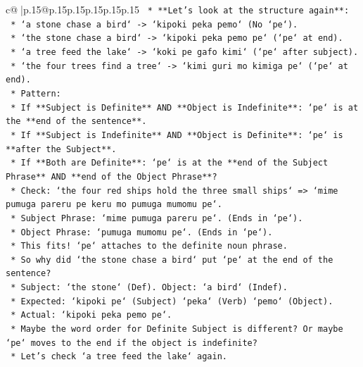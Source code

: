 \documentclass{article}
\begin{document}
{\begin{supertabular}{c@{$\;$}|p{.15\linewidth}@{}p{.15\linewidth}p{.15\linewidth}p{.15\linewidth}p{.15\linewidth}p{.15\linewidth}}
{{{\texttt{            *   **Let's look at the structure again**:} \\
\texttt{                *   `a stone chase a bird` {-}> `kipoki peka pemo` (No `pe`).} \\
\texttt{                *   `the stone chase a bird` {-}> `kipoki peka pemo pe` (`pe` at end).} \\
\texttt{                *   `a tree feed the lake` {-}> `koki pe gafo kimi` (`pe` after subject).} \\
\texttt{                *   `the four trees find a tree` {-}> `kimi guri mo kimiga pe` (`pe` at end).} \\
\texttt{            *   Pattern:} \\
\texttt{                *   If **Subject is Definite** AND **Object is Indefinite**: `pe` is at the **end of the sentence**.} \\
\texttt{                *   If **Subject is Indefinite** AND **Object is Definite**: `pe` is **after the Subject**.} \\
\texttt{                *   If **Both are Definite**: `pe` is at the **end of the Subject Phrase** AND **end of the Object Phrase**?} \\
\texttt{                    *   Check: `the four red ships hold the three small ships` => `mime pumuga pareru pe keru mo pumuga mumomu pe`.} \\
\texttt{                    *   Subject Phrase: `mime pumuga pareru pe`. (Ends in `pe`).} \\
\texttt{                    *   Object Phrase: `pumuga mumomu pe`. (Ends in `pe`).} \\
\texttt{                    *   This fits! `pe` attaches to the definite noun phrase.} \\
\texttt{                *   So why did `the stone chase a bird` put `pe` at the end of the sentence?} \\
\texttt{                    *   Subject: `the stone` (Def). Object: `a bird` (Indef).} \\
\texttt{                    *   Expected: `kipoki pe` (Subject) `peka` (Verb) `pemo` (Object).} \\
\texttt{                    *   Actual: `kipoki peka pemo pe`.} \\
\texttt{                    *   Maybe the word order for Definite Subject is different? Or maybe `pe` moves to the end if the object is indefinite?} \\
\texttt{                    *   Let's check `a tree feed the lake` again.} \\
}}}
\end{supertabular}}
\end{document}
